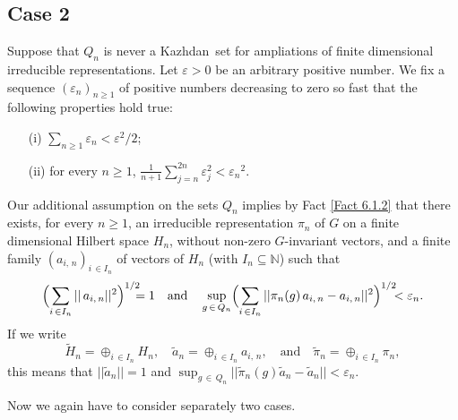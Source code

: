 \documentclass[11pt,english,a4paper]{smfart}
\numberwithin{equation}{section}
\theoremstyle{definition}
\begin{document}
\subsection{Case 2}\label{Section 6.6} Suppose that ${Q_{n}}$ is 
never a {Kazhdan}\ set for ampliations of finite dimensional irreducible 
representations. Let $\varepsilon >0$ 
be an arbitrary positive number. We fix a sequence $({\varepsilon _{n}})_{n\ge 1}$ of 
positive numbers decreasing to zero so fast that the following properties 
hold true:
\begin{enumerate}
 \item [(i)] $\sum_{n\ge 1}{\varepsilon _{n}}<\varepsilon ^{2}/2$;
 \item[(ii)] for every ${n\ge 1}$, $\frac{1}{n+1}\sum_{j=n}^{2n}\varepsilon 
_{j}^{2}<{\varepsilon _{n}}^{2}$.
\end{enumerate}
Our additional assumption on the sets ${Q_{n}}$ implies  by Fact \ref{Fact 6.1.2} that there exists, for every 
${n\ge 1}$,  an irreducible representation $\pi _{n}$ of $G$ on a 
finite dimensional Hilbert space $H_{n}$, without non-zero $G$-invariant 
vectors, and a finite family $(a_{i,\,n})_{i\,\in I_{n}}$ of vectors 
of 
$H_{n}$ (with $I_{n}\subseteq {\ensuremath{\mathbb N}}$) such that 
\begin{equation}\label{eq++}
\Bigl(\sum_{i\,\in I_{n}}||\,a_{i,\,n}||^{2} 
\Bigr)^{1/2}\!\!\!\!=1\quad\textrm{and}\quad\sup_{g\,\in\,{Q_{n}}}
\Bigl(\sum_{i\,\in I_{n}}||\pi _{n}(g)\,a_{i,\,n}-a_{i,\,n} 
||^{2}\Bigr)^{1/2}\!\!\!<{\varepsilon _{n}}.
\end{equation}
 If we write 
\[
{\widetilde{{H}}}_{n}={\mathop{\oplus}}_{i\,\in I_{n}}H_{n},\quad {\widetilde{{a}}}_{n}={\mathop{\oplus}}_{i\,\in 
I_{n}}a_{i,\,n},\quad \textrm{and}\quad {\widetilde{{\pi }}}_{n}={\mathop{\oplus}}_{i\,\in 
I_{n}}\pi 
_{n},
\]
this means that $||{\widetilde{{a}}}_{n}||=1$ and $\sup_{g\,\in\,{Q_{n}}}||{\widetilde{{\pi 
}}}_{n}(g){\widetilde{{a}}}_{n}-
{\widetilde{{a}}}_{n}||<{\varepsilon _{n}}$.
\par\smallskip 
 Now we again have to consider separately two cases.
\end{document}
